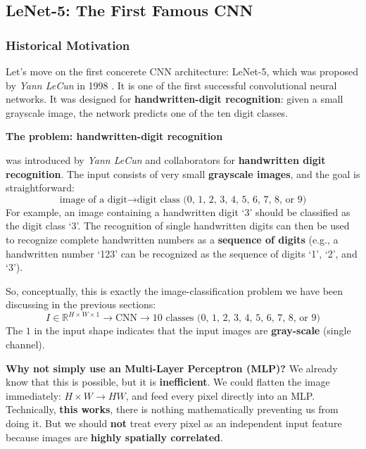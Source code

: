 \subsection{LeNet-5: The First Famous CNN}\label{sec:lenet-5-the-first-famous-cnn}

\subsubsection{Historical Motivation}\label{sec:historical-motivation}

Let's move on the first concerete CNN architecture: LeNet-5, which was proposed by \emph{Yann LeCun} in 1998 \cite{lecun1998gradient}. It is one of the first successful convolutional neural networks. It was designed for \textbf{handwritten-digit recognition}: given a small grayscale image, the network predicts one of the ten digit classes.

\highspace
\begin{flushleft}
    \textcolor{Red2}{ \textbf{The problem: handwritten-digit recognition}}
\end{flushleft}
 was introduced by \emph{Yann LeCun} and collaborators for \textbf{handwritten digit recognition}. The input consists of very small \textbf{grayscale images}, and the goal is straightforward:
\begin{equation*}
    \text{image of a digit} \to \text{digit class (0, 1, 2, 3, 4, 5, 6, 7, 8, or 9)}
\end{equation*}
For example, an image containing a handwritten digit `3' should be classified as the digit class `3'. The recognition of single handwritten digits can then be used to recognize complete handwritten numbers as a \textbf{sequence of digits} (e.g., a handwritten number `123' can be recognized as the sequence of digits `1', `2', and `3').

\highspace
So, conceptually, this is exactly the image-classification problem we have been discussing in the previous sections:
\begin{equation*}
    I \in \mathbb{R}^{H \times W \times 1} \to \text{CNN} \to \text{10 classes (0, 1, 2, 3, 4, 5, 6, 7, 8, or 9)}
\end{equation*}
The $1$ in the input shape indicates that the input images are \textbf{gray-scale} (single channel).

\highspace
\textcolor{Green3}{ \textbf{Why not simply use an Multi-Layer Perceptron (MLP)?}} We already know that this is possible, but it is \textbf{inefficient}. We could flatten the image immediately: $H \times W \to HW$, and feed every pixel directly into an MLP. Technically, \textbf{this works}, there is nothing mathematically preventing us from doing it. But we should \textbf{not} treat every pixel as an independent input feature because images are \textbf{highly spatially correlated}.

